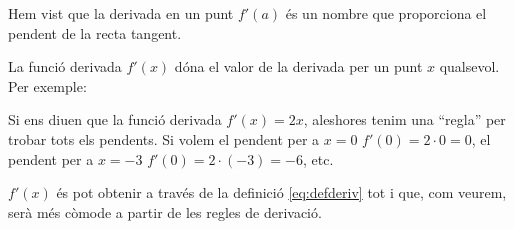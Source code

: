 \begin{theorybox}
	
	Hem vist que la derivada en un punt $f'(a)$ és un nombre que proporciona el pendent de la recta tangent.
	
	La funció derivada $f'(x)$ dóna el valor de la derivada per un punt $x$ qualsevol. Per exemple:
	
	Si ens diuen que la funció derivada $f'(x)=2x$, aleshores tenim una ``regla'' per trobar tots els pendents. Si volem el pendent per a $x=0$  $f'(0)=2\cdot 0=0$, el pendent per a $x=-3$  $f'(0)=2\cdot (-3)=-6$, etc. 
	
	
	$f'(x)$ és pot obtenir a través de la definició  \ref{eq:defderiv} tot i que, com veurem, serà més còmode a partir de les regles de derivació.
\end{theorybox}


